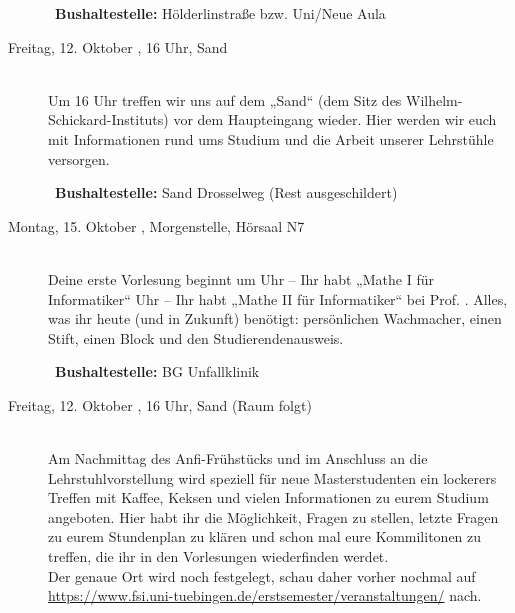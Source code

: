 \begin{description}
~\textbf{Bushaltestelle:} Hölderlinstraße bzw. Uni/Neue Aula
\fi


\item[Freitag, 12. Oktober \Jahr, 16 Uhr, Sand]\ \\
Um 16 Uhr treffen wir uns auf dem „Sand“ (dem Sitz des Wilhelm-Schickard-Instituts) vor dem Haupteingang
wieder. Hier werden wir euch mit Informationen rund ums Studium und die Arbeit unserer Lehrstühle versorgen.

~\textbf{Bushaltestelle:} Sand Drosselweg (Rest ausgeschildert)

\ifbachelor
\item[Montag, 15. Oktober \Jahr, Morgenstelle, Hörsaal N7]\ \\
Deine erste Vorlesung beginnt um 
 Uhr -- Ihr habt „Mathe I für Informatiker“  \fi
{} Uhr -- Ihr habt „Mathe II für Informatiker“  \fi
bei Prof. \Matheprof.
Alles, was ihr heute (und in Zukunft) benötigt: persönlichen Wachmacher, einen Stift, einen Block und den Studierendenausweis.

~\textbf{Bushaltestelle:} BG Unfallklinik
\fi

\ifmaster
\item[Freitag, 12. Oktober \Jahr, 16 Uhr, Sand (Raum folgt)]\ \\
Am Nachmittag des Anfi-Frühstücks und im Anschluss an die Lehrstuhlvorstellung wird speziell für neue Masterstudenten ein lockerers Treffen mit Kaffee, Keksen und vielen Informationen zu eurem Studium angeboten.
Hier habt ihr die Möglichkeit, Fragen zu stellen, letzte Fragen zu eurem Stundenplan zu klären und schon mal eure Kommilitonen zu treffen, die ihr in den Vorlesungen wiederfinden werdet. \\
Der genaue Ort wird noch festgelegt, schau daher vorher nochmal auf \url{https://www.fsi.uni-tuebingen.de/erstsemester/veranstaltungen/} nach.
\fi





\end{description}
